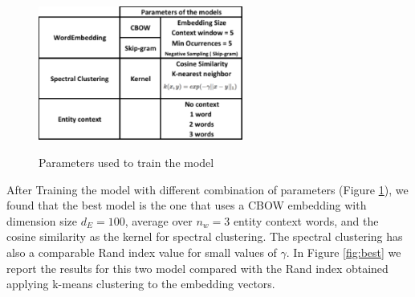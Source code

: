 \documentclass[]{article}
\begin{document}
\begin{figure}[h]
	\caption{Parameters used to train the model}
	\centering
	\includegraphics[width=0.6\textwidth]{Figures_Mik/Parameters.png}
	\label{fig:params}
\end{figure}


After Training the model with different combination of parameters (Figure \ref{fig:params}), we found that the best model is the one that uses a CBOW embedding with dimension size $d_E=100$, average over $n_w=3$ entity context words, and the cosine similarity as the kernel for spectral clustering. The spectral clustering has also a comparable Rand index value for small values of $\gamma$. In Figure \ref{fig:best} we report the results for this two model compared with the Rand index obtained applying k-means clustering to the embedding vectors. 
\end{document}
